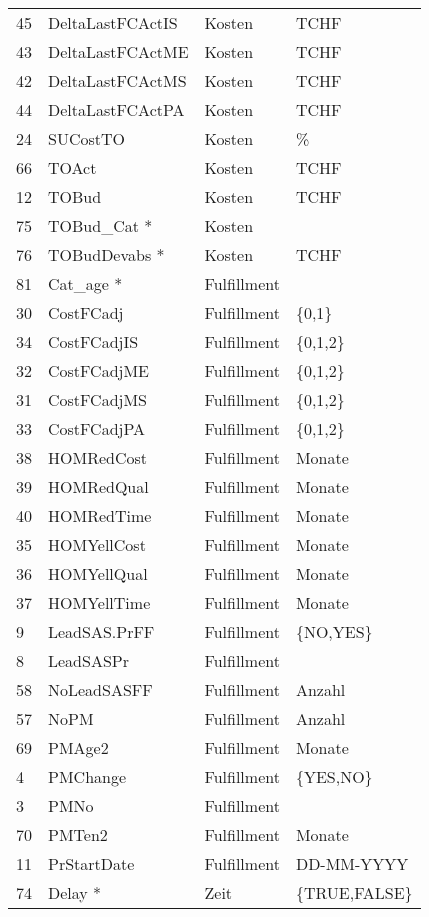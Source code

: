\begin{longtable}[ht]{p{} p{} p{} p{}}
	45    & DeltaLastFCActIS & Kosten & TCHF \\
	43    & DeltaLastFCActME & Kosten & TCHF \\
	42    & DeltaLastFCActMS & Kosten & TCHF \\
	44    & DeltaLastFCActPA & Kosten & TCHF \\
	24    & SUCostTO & Kosten & \% \\
	66    & TOAct & Kosten & TCHF \\
	12    & TOBud & Kosten & TCHF \\
	75    & TOBud\_Cat * & Kosten &  \\
	76    & TOBudDevabs * & Kosten & TCHF \\
	81    & Cat\_age * & Fulfillment &  \\
	30    & CostFCadj & Fulfillment & \{0,1\} \\
	34    & CostFCadjIS & Fulfillment & \{0,1,2\} \\
	32    & CostFCadjME & Fulfillment & \{0,1,2\}\\
	31    & CostFCadjMS & Fulfillment & \{0,1,2\} \\
	33    & CostFCadjPA & Fulfillment & \{0,1,2\} \\
	38    & HOMRedCost & Fulfillment & Monate \\
	39    & HOMRedQual & Fulfillment & Monate \\
	40    & HOMRedTime & Fulfillment & Monate \\
	35    & HOMYellCost & Fulfillment & Monate \\
	36    & HOMYellQual & Fulfillment & Monate \\
	37    & HOMYellTime & Fulfillment & Monate \\
	9     & LeadSAS.PrFF & Fulfillment & \{NO,YES\} \\
	8     & LeadSASPr & Fulfillment &  \\
	58    & NoLeadSASFF & Fulfillment & Anzahl\\
	57    & NoPM  & Fulfillment & Anzahl \\
	69    & PMAge2 & Fulfillment & Monate \\
	4     & PMChange & Fulfillment & \{YES,NO\} \\
	3     & PMNo  & Fulfillment &  \\
	70    & PMTen2 & Fulfillment & Monate \\
	11    & PrStartDate & Fulfillment & DD-MM-YYYY \\
	74    & Delay * & Zeit  & \{TRUE,FALSE\} \\

\end{longtable}
